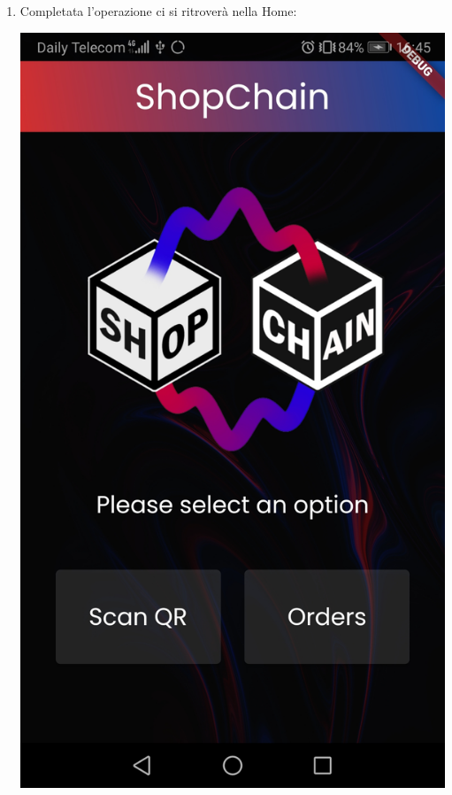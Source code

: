 \begin{enumerate}
    \item Completata l'operazione ci si ritroverà nella Home:\\
     \begin{center}
        \includegraphics[scale = 0.1]{img/homeMobile.jpg}
    \end{center}
\end{enumerate}

